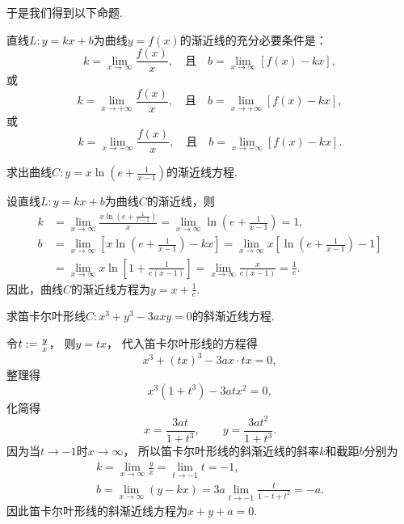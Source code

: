 于是我们得到以下命题.
\begin{proposition}
直线\(L: y = kx+b\)为曲线\(y = f(x)\)的渐近线的充分必要条件是：\[
	k = \lim_{x\to\infty} \frac{f(x)}{x},
	\quad\text{且}\quad
	b = \lim_{x\to\infty} \left[f(x) - kx\right],
\]
或\[
	k = \lim_{x\to+\infty} \frac{f(x)}{x},
	\quad\text{且}\quad
	b = \lim_{x\to+\infty} \left[f(x) - kx\right],
\]
或\[
	k = \lim_{x\to-\infty} \frac{f(x)}{x},
	\quad\text{且}\quad
	b = \lim_{x\to-\infty} \left[f(x) - kx\right].
\]
\end{proposition}

\begin{example}
求出曲线\(C: y = x \ln\left(e+\frac{1}{x-1}\right)\)的渐近线方程.
\begin{solution}
设直线\(L: y = kx+b\)为曲线\(C\)的渐近线，则\begin{align*}
	k &= \lim_{x\to\infty} \frac{x \ln\left(e+\frac{1}{x-1}\right)}{x}
	= \lim_{x\to\infty} \ln\left(e+\frac{1}{x-1}\right)
	= 1, \\
	b &= \lim_{x\to\infty} \left[ x \ln\left(e+\frac{1}{x-1}\right) - kx \right]
	= \lim_{x\to\infty} x \left[ \ln\left(e+\frac{1}{x-1}\right) - 1 \right] \\
	&= \lim_{x\to\infty} x \ln\left[1+\frac{1}{e(x-1)}\right]
	= \lim_{x\to\infty} \frac{x}{e(x-1)}
	= \frac{1}{e}.
\end{align*}
因此，曲线\(C\)的渐近线方程为\(y = x + \frac{1}{e}\).
\end{solution}
\end{example}

\begin{example}
求笛卡尔叶形线\(C: x^3+y^3-3axy=0\)的斜渐近线方程.
\begin{solution}
令\(t := \frac{y}{x}\)，
则\(y = tx\)，
代入笛卡尔叶形线的方程得\[
	x^3+(tx)^3-3ax \cdot tx = 0,
\]
整理得\[
	x^3(1+t^3)-3atx^2=0,
\]
化简得\[
	x = \frac{3at}{1+t^3},
	\qquad
	y = \frac{3at^2}{1+t^3}.
\]
因为当\(t\to-1\)时\(x\to\infty\)，
所以笛卡尔叶形线的斜渐近线的斜率\(k\)和截距\(b\)分别为\begin{gather*}
	k = \lim_{x\to\infty} \frac{y}{x}
	= \lim_{t\to-1} t
	= -1, \\
	b = \lim_{x\to\infty} (y-kx)
	= 3a \lim_{t\to-1} \frac{t}{1-t+t^2}
	= -a.
\end{gather*}
因此笛卡尔叶形线的斜渐近线方程为\(x+y+a=0\).
\end{solution}
\end{example}

